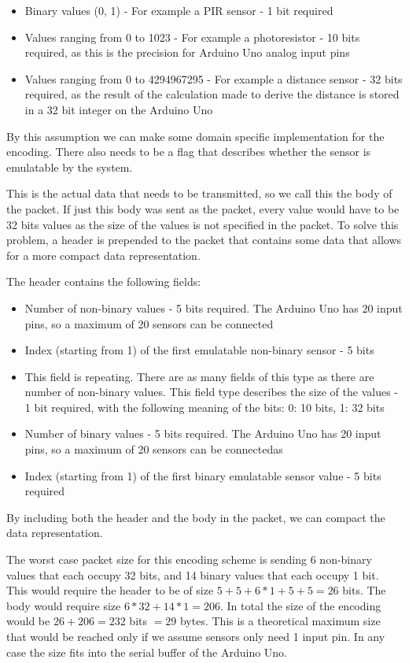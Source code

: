 \begin{itemize}
\item Binary values (0, 1) - For example a PIR sensor - 1 bit required
\item Values ranging from 0 to 1023 - For example a photoresistor - 10 bits required, as this is the precision for Arduino Uno analog input pins
\item Values ranging from 0 to 4294967295 - For example a distance sensor - 32 bits required, as the result of the calculation made to derive the distance is stored in a 32 bit integer on the Arduino Uno
\end{itemize}
By this assumption we can make some domain specific implementation for the encoding.
There also needs to be a flag that describes whether the sensor is emulatable by the system.

This is the actual data that needs to be transmitted, so we call this the body of the packet. If just this body was sent as the packet, every value would have to be 32 bits values as the size of the values is not specified in the packet. To solve this problem, a header is prepended to the packet that contains some data that allows for a more compact data representation.

The header contains the following fields:

\begin{itemize}
\item Number of non-binary values - 5 bits required. The Arduino Uno has 20 input pins, so a maximum of 20 sensors can be connected
\item Index (starting from 1) of the first emulatable non-binary sensor - 5 bits
\item This field is repeating. There are as many fields of this type as there are number of non-binary values. This field type describes the size of the values - 1 bit required, with the following meaning of the bits: 0: 10 bits, 1: 32 bits
\item Number of binary values - 5 bits required. The Arduino Uno has 20 input pins, so a maximum of 20 sensors can be connectedas
\item Index (starting from 1) of the first binary emulatable sensor value - 5 bits required
\end{itemize}

By including both the header and the body in the packet, we can compact the data representation.

The worst case packet size for this encoding scheme is sending 6 non-binary values that each occupy 32 bits, and 14 binary values that each occupy 1 bit. This would require the header to be of size $5 + 5 + 6 * 1 + 5 + 5 = 26$ bits. The body would require size $6 * 32 + 14 * 1 = 206$. In total the size of the encoding would be $26 + 206 = 232$ bits $= 29$ bytes. This is a theoretical maximum size that would be reached only if we assume sensors only need 1 input pin. In any case the size fits into the serial buffer of the Arduino Uno.

